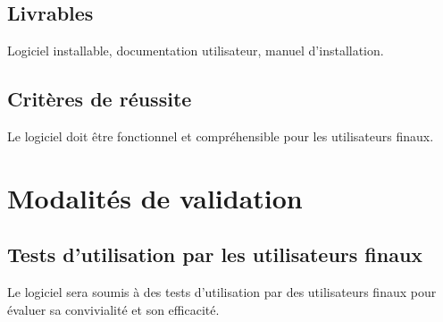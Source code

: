 \documentclass{article}
\begin{document}
\subsection{Livrables}
Logiciel installable, documentation utilisateur, manuel d'installation.
\subsection{Critères de réussite}
Le logiciel doit être fonctionnel et compréhensible pour les utilisateurs finaux.

\section{Modalités de validation}
\subsection{Tests d'utilisation par les utilisateurs finaux}
Le logiciel sera soumis à des tests d'utilisation par des utilisateurs finaux pour évaluer sa convivialité et son efficacité.
\end{document}
